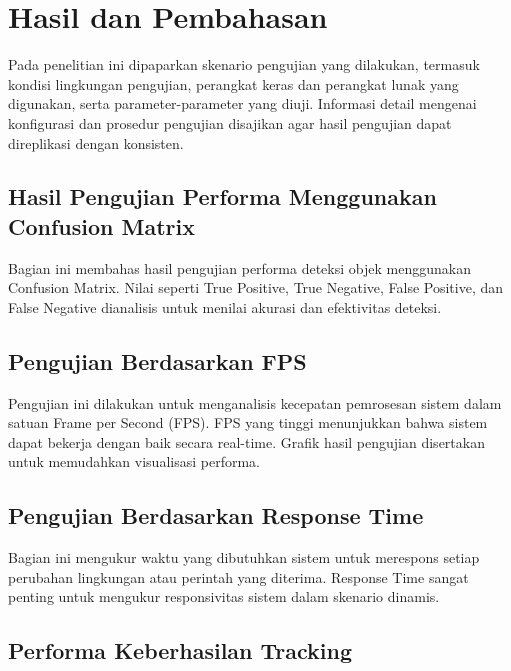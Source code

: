\section{Hasil dan Pembahasan}
\label{sec:hasildanpembahasan}

Pada penelitian ini dipaparkan skenario pengujian yang dilakukan, termasuk kondisi lingkungan pengujian, perangkat keras dan perangkat lunak yang digunakan, serta parameter-parameter yang diuji. Informasi detail mengenai konfigurasi dan prosedur pengujian disajikan agar hasil pengujian dapat direplikasi dengan konsisten.

\subsection{Hasil Pengujian Performa Menggunakan Confusion Matrix}
\label{subsec:hasilperformaconfisionMatrix}

Bagian ini membahas hasil pengujian performa deteksi objek menggunakan Confusion Matrix. Nilai seperti True Positive, True Negative, False Positive, dan False Negative dianalisis untuk menilai akurasi dan efektivitas deteksi.

\subsection{Pengujian Berdasarkan FPS}
\label{subsec:pengujianberdasarkanfps}

Pengujian ini dilakukan untuk menganalisis kecepatan pemrosesan sistem dalam satuan Frame per Second (FPS). FPS yang tinggi menunjukkan bahwa sistem dapat bekerja dengan baik secara real-time. Grafik hasil pengujian disertakan untuk memudahkan visualisasi performa.

\subsection{Pengujian Berdasarkan Response Time}
\label{subsec:pengujianberdasarkanresponsetime}

Bagian ini mengukur waktu yang dibutuhkan sistem untuk merespons setiap perubahan lingkungan atau perintah yang diterima. Response Time sangat penting untuk mengukur responsivitas sistem dalam skenario dinamis.

\subsection{Performa Keberhasilan Tracking}
\label{subsec:performakeberhasiltracking}

